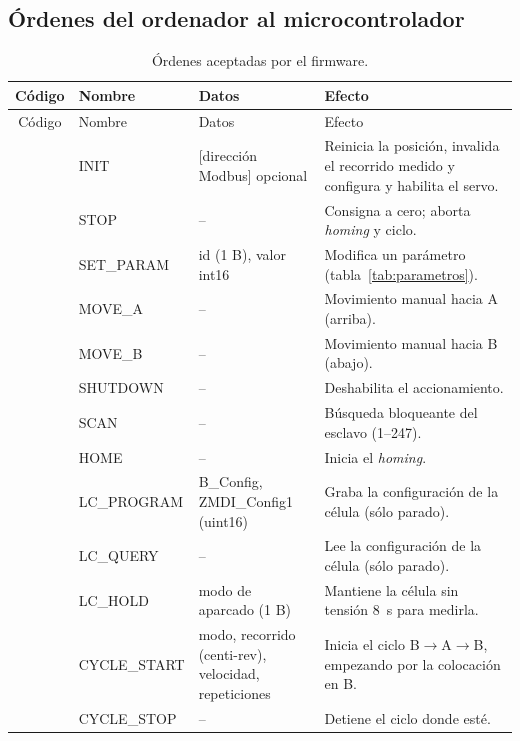 \subsection{Órdenes del ordenador al microcontrolador}

\begin{longtable}{@{}clL{0.30\textwidth}L{0.33\textwidth}@{}}
\caption{Órdenes aceptadas por el firmware.}\label{tab:ordenes}\\
\toprule
Código & Nombre & Datos & Efecto \\
\midrule
\endfirsthead
\toprule
Código & Nombre & Datos & Efecto \\
\midrule
\endhead
{} & INIT & [dirección Modbus] opcional & Reinicia la posición, invalida el recorrido medido y configura y habilita el servo. \\
 & STOP & -- & Consigna a cero; aborta \emph{homing} y ciclo. \\
 & SET\_PARAM & id (1 B), valor int16 & Modifica un parámetro (tabla~\ref{tab:parametros}). \\
 & MOVE\_A & -- & Movimiento manual hacia A (arriba). \\
 & MOVE\_B & -- & Movimiento manual hacia B (abajo). \\
 & SHUTDOWN & -- & Deshabilita el accionamiento. \\
 & SCAN & -- & Búsqueda bloqueante del esclavo (1--247). \\
 & HOME & -- & Inicia el \emph{homing}. \\
 & LC\_PROGRAM & B\_Config, ZMDI\_Config1 (uint16) & Graba la configuración de la célula (sólo parado). \\
 & LC\_QUERY & -- & Lee la configuración de la célula (sólo parado). \\
 & LC\_HOLD & modo de aparcado (1 B) & Mantiene la célula sin tensión \SI{8}{\second} para medirla. \\
 & CYCLE\_START & modo, recorrido (centi-rev), velocidad, repeticiones & Inicia el ciclo B$\rightarrow$A$\rightarrow$B, empezando por la colocación en B. \\
 & CYCLE\_STOP & -- & Detiene el ciclo donde esté. \\
\bottomrule
\end{longtable}

